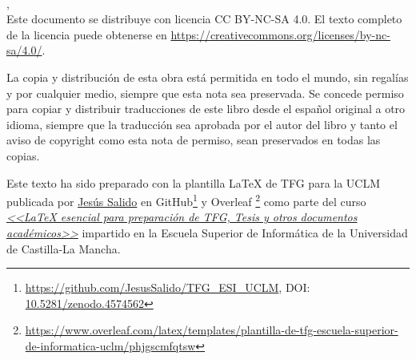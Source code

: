 %
%


\ifspanish
\else
\fi
\null\vspace{6cm}
\makeatletter
{\small \noindent \@tituloCorto\\
\textcopyright{} \@autor, \@yearTF\\[1cm]
Este documento se distribuye con licencia CC BY-NC-SA 4.0. El texto completo de la licencia puede obtenerse en \url{https://creativecommons.org/licenses/by-nc-sa/4.0/}.
\makeatother

La copia y distribución de esta obra está permitida en todo el mundo, sin regalías y por cualquier medio, siempre que esta nota sea preservada. Se concede permiso para copiar y distribuir traducciones de este libro desde el español original a otro idioma, siempre que la traducción sea aprobada por el autor del libro y tanto el aviso de copyright como esta nota de permiso, sean preservados en todas las copias.


\vfill
Este texto ha sido preparado con la plantilla \LaTeX{} de TFG para la UCLM publicada por \href{https://www.esi.uclm.es/www/jsalido}{Jesús Salido} en GitHub\footnote{\url{https://github.com/JesusSalido/TFG_ESI_UCLM}, DOI: \href{https://zenodo.org/badge/latestdoi/191907589}{10.5281/zenodo.4574562}} y Overleaf \footnote{\url{https://www.overleaf.com/latex/templates/plantilla-de-tfg-escuela-superior-de-informatica-uclm/phjgscmfqtsw}} como parte del curso \href{http://visilab.etsii.uclm.es/?page_id=1468}{\emph{<<\LaTeX{} esencial para preparación de TFG, Tesis y otros documentos académicos>>}} impartido en la Escuela Superior de Informática de la Universidad de Castilla-La Mancha.}

